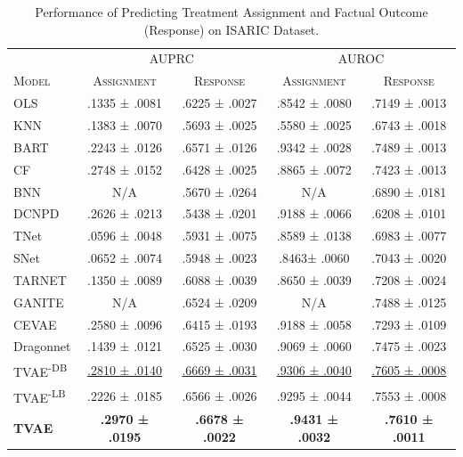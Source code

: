 \begin{table}[t]
  \caption{Performance of Predicting Treatment Assignment and Factual Outcome (Response) on ISARIC Dataset.}
  \label{Table1}
  \centering
\fontsize{7.5pt}{9pt}\selectfont
  
  \begin{tabular}{lcccc}
    \toprule
    & \multicolumn{2}{c}{AUPRC}&\multicolumn{2}{c}{AUROC}\\
    \textsc{Model} & \textsc{Assignment} & \textsc{Response} &  \textsc{Assignment} & \textsc{Response}\\
    \midrule
    OLS & .1335 ± .0081  & .6225 ± .0027    & .8542 ± .0080  & .7149 ± .0013  \\
    KNN  & .1383 ± .0070  & .5693 ± .0025    & .5580 ± .0025  & .6743 ± .0018 \\
    BART & .2243 ± .0126  & .6571 ± .0126    & .9342 ± .0028  & .7489 ± .0013  \\
    CF  & .2748 ± .0152  & .6428 ± .0025    & .8865 ± .0072  & .7423 ± .0013  \\
    BNN  & N/A  & .5670 ± .0264    &  N/A &  .6890 ± .0181 \\
    DCNPD   & .2626 ± .0213  & .5438 ± .0201    & .9188 ± .0066  & .6208 ± .0101  \\
    TNet    & .0596 ± .0048  & .5931 ± .0075    & .8589 ± .0138  & .6983 ± .0077  \\
    SNet    & .0652 ± .0074  & .5948 ± .0023    & .8463± .0060  & .7043 ± .0020  \\
    TARNET    & .1350 ± .0089  & .6088 ± .0039    & .8650 ± .0039 & .7208 ± .0024  \\
    GANITE   & N/A  & .6524 ± .0209    & N/A  & .7488 ± .0125  \\
    CEVAE   & .2580 ± .0096  & .6415 ± .0193    & .9188 ± .0058  & .7293 ± .0109  \\
    Dragonnet    & .1439 ± .0121  & .6525 ± .0030    & .9069 ± .0060  & .7475 ± .0023  \\
    \midrule
    TVAE\textsuperscript{-DB} &  \underline{.2810 ± .0140} & \underline{.6669 ± .0031} &	\underline{.9306 ± .0040} &	\underline{.7605 ± .0008}
     \\
    TVAE\textsuperscript{-LB} &  .2226 ± .0185 & .6566 ± .0026 &	.9295 ± .0044 &	.7553 ± .0008
     \\      
    \textbf{TVAE}    & \textbf{.2970 ± .0195}  & \textbf{.6678 ± .0022}    & \textbf{.9431 ± .0032}  & \textbf{.7610 ± .0011}  \\
    \bottomrule
  \end{tabular}
\end{table}
















